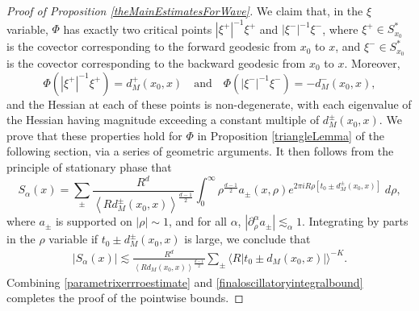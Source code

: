 \begin{proof}[Proof of Proposition \ref{theMainEstimatesForWave}]
%
%
%
We claim that, in the $\xi$ variable, $\Phi$ has exactly two critical points $|\xi^+|^{-1} \xi^+$ and $|\xi^-|^{-1} \xi^-$, where $\xi^+ \in S_{x_0}^*$ is the covector corresponding to the forward geodesic from $x_0$ to $x$, and $\xi^- \in S_{x_0}^*$ is the covector corresponding to the backward geodesic from $x_0$ to $x$. Moreover,
%
\begin{equation}
    \Phi(|\xi^+|^{-1} \xi^+) = d_M^+(x_0,x) \quad\text{and}\quad \Phi(|\xi^-|^{-1} \xi^-) = - d_M^-(x_0,x),
\end{equation}
%
and the Hessian at each of these points is non-degenerate, with each eigenvalue of the Hessian having magnitude exceeding a constant multiple of $d_M^{\pm}(x_0,x)$. We prove that these properties hold for $\Phi$ in Proposition \ref{triangleLemma} of the following section, via a series of geometric arguments. It then follows from the principle of stationary phase that
%
\begin{equation}
    S_\alpha(x) = \sum_{\pm} \frac{R^{d}}{\left\langle R d_M^{\pm}(x_0,x) \right\rangle^{\frac{d-1}{2}}} \int_0^\infty \rho^{\frac{d-1}{2}} a_{\pm}(x,\rho) e^{2 \pi i R \rho [ t_0 \pm d_M^{\pm}(x_0,x)]}\; d\rho,
\end{equation}
%
where $a_{\pm}$ is supported on $|\rho| \sim 1$, and for all $\alpha$, $|\partial_\rho^\alpha a_{\pm}| \lesssim_\alpha 1$. Integrating by parts in the $\rho$ variable if $t_0 \pm d_M^{\pm}(x_0,x)$ is large, we conclude that
%
%
% 
% 
%
\begin{equation} \label{finaloscillatoryintegralbound}
\begin{split}
    |S_\alpha(x)| \lesssim \frac{R^{d}}{\left\langle R d_M(x_0,x) \right\rangle^{\frac{d-1}{2}}} \sum_{\pm} \big\langle R |t_0 \pm d_M(x_0,x)| \big\rangle^{-K}.
\end{split}
\end{equation}
%
Combining \eqref{parametrixerrroestimate} and \eqref{finaloscillatoryintegralbound} completes the proof of the pointwise bounds.


\end{proof}
